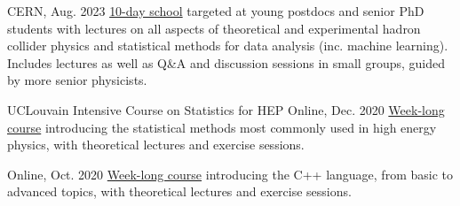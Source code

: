 
\begin{cventries}
    {}{CERN, Aug. 2023}
    {\href{https://indico.cern.ch/event/1234112/}{10-day school} targeted at young postdocs and senior PhD students with lectures on all aspects of theoretical and experimental hadron collider physics and statistical methods for data analysis (inc. machine learning). Includes lectures as well as Q\&A and discussion sessions in small groups, guided by more senior physicists.}\vspace*{2mm}

    
    \cventry
    {{UCLouvain Intensive Course on Statistics for HEP}}{}
    {}{Online, Dec. 2020}
    {\href{https://agenda.irmp.ucl.ac.be/event/4097/}{Week-long course} introducing the statistical methods most commonly used in high energy physics, with theoretical lectures and exercise sessions.}\vspace*{2mm}
    
    {}{Online, Oct. 2020}
    {\href{https://indico.cern.ch/event/946584}{Week-long course} introducing the C++ language, from basic to advanced topics, with theoretical lectures and exercise sessions.}\vspace*{2mm}
        




\end{cventries}

